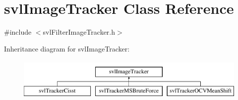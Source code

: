 \hypertarget{classsvl_image_tracker}{}\section{svl\+Image\+Tracker Class Reference}
\label{classsvl_image_tracker}


{\ttfamily \#include $<$svl\+Filter\+Image\+Tracker.\+h$>$}

Inheritance diagram for svl\+Image\+Tracker\+:\begin{figure}[H]
\begin{center}
\leavevmode
\includegraphics[height=2.000000cm]{d6/d52/classsvl_image_tracker}
\end{center}
\end{figure}
